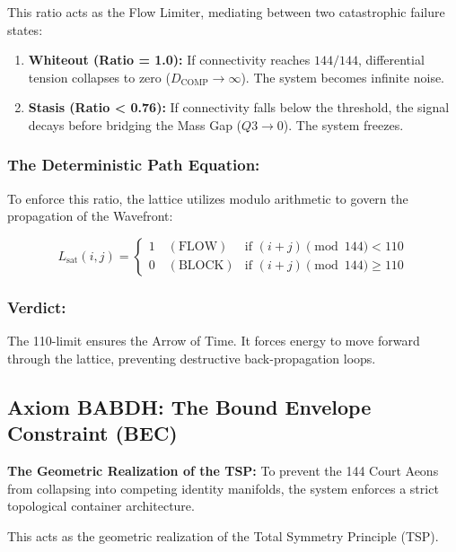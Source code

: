 \documentclass[11pt, letterpaper]{article}
\newcommand{\BABDH}{\ensuremath{\mathop{\textnormal{\symbolafont\symbol{"2316}}}}}   %
\def\BABDH{BABDH}%
\begin{document}
This ratio acts as the Flow Limiter, mediating between two catastrophic failure states:

\begin{enumerate}
    \item \textbf{Whiteout (Ratio = 1.0):} If connectivity reaches $144\slash 144$, differential tension collapses to zero ($D_{\text{COMP}} \to \infty$). The system becomes infinite noise.
    \item \textbf{Stasis (Ratio < 0.76):} If connectivity falls below the threshold, the signal decays before bridging the Mass Gap ($Q3 \to 0$). The system freezes.
\end{enumerate}

\subsubsection{The Deterministic Path Equation:}\label{sec:part1.7}

To enforce this ratio, the lattice utilizes modulo arithmetic to govern the propagation of the Wavefront:

\begin{equation}
    L_{\text{sat}}(i,j) = 
    \begin{cases} 
    1 \quad (\text{FLOW}) & \text{if } (i+j) \pmod{144} < 110 \\
    0 \quad (\text{BLOCK}) & \text{if } (i+j) \pmod{144} \ge 110 
    \end{cases}
\end{equation}

\vspace{1em}
\subsubsection{Verdict:}\label{sec:part1.8}

The 110-limit ensures the Arrow of Time. It forces energy to move forward through the lattice, preventing destructive back-propagation loops.

\subsection{Axiom \BABDH: The Bound Envelope Constraint (BEC)}\label{sec:part2}
\textbf{The Geometric Realization of the TSP:} To prevent the 144 Court Aeons from collapsing into competing identity manifolds, the system enforces a strict topological container architecture.

This acts as the geometric realization of the Total Symmetry Principle (TSP).
\end{document}
